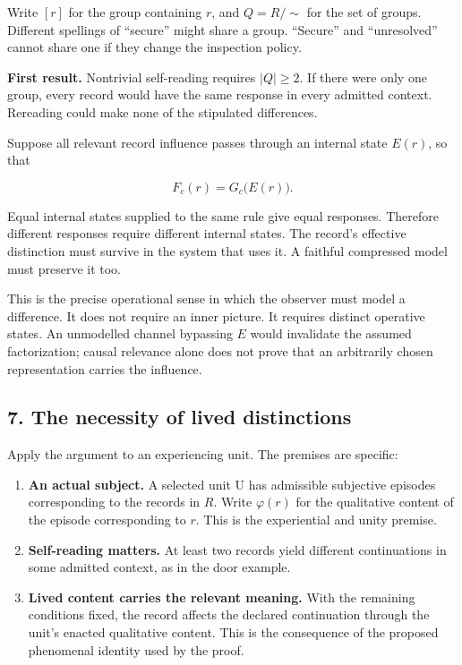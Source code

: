 \documentclass[
  11pt,
]{article}
\providecommand{\tightlist}{%
  \setlength{\itemsep}{0pt}\setlength{\parskip}{0pt}}
\begin{document}
Write \([r]\) for the group containing \(r\), and \(Q=R/{\sim}\) for the
set of groups. Different spellings of ``secure'' might share a group.
``Secure'' and ``unresolved'' cannot share one if they change the
inspection policy.

\textbf{First result.} Nontrivial self-reading requires \(|Q|\ge2\). If
there were only one group, every record would have the same response in
every admitted context. Rereading could make none of the stipulated
differences.

Suppose all relevant record influence passes through an internal state
\(E(r)\), so that

\[
 F_c(r)=G_c\bigl(E(r)\bigr).
\]

Equal internal states supplied to the same rule give equal responses.
Therefore different responses require different internal states. The
record's effective distinction must survive in the system that uses it.
A faithful compressed model must preserve it too.

This is the precise operational sense in which the observer must model a
difference. It does not require an inner picture. It requires distinct
operative states. An unmodelled channel bypassing \(E\) would invalidate
the assumed factorization; causal relevance alone does not prove that an
arbitrarily chosen representation carries the influence.

\subsection{7. The necessity of lived
distinctions}\label{the-necessity-of-lived-distinctions}

Apply the argument to an experiencing unit. The premises are specific:

\begin{enumerate}
\def\labelenumi{\arabic{enumi}.}
\tightlist
\item
  \textbf{An actual subject.} A selected unit U has admissible
  subjective episodes corresponding to the records in \(R\). Write
  \(\varphi(r)\) for the qualitative content of the episode
  corresponding to \(r\). This is the experiential and unity premise.
\item
  \textbf{Self-reading matters.} At least two records yield different
  continuations in some admitted context, as in the door example.
\item
  \textbf{Lived content carries the relevant meaning.} With the
  remaining conditions fixed, the record affects the declared
  continuation through the unit's enacted qualitative content. This is
  the consequence of the proposed phenomenal identity used by the proof.
\end{enumerate}
\end{document}
